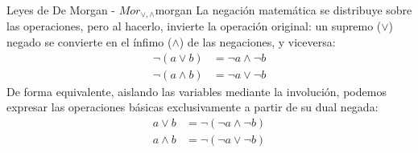 \begin{teorema}{Leyes de De Morgan - $Mor_{\vee, \wedge}$}{morgan}
La negación matemática se distribuye sobre las operaciones, pero al hacerlo, invierte la operación original: un supremo ($\vee$) negado se convierte en el ínfimo ($\wedge$) de las negaciones, y viceversa:
\begin{align}
    \neg (a \vee b) &= \neg a \wedge \neg b \\
    \neg (a \wedge b) &= \neg a \vee \neg b 
\end{align}
De forma equivalente, aislando las variables mediante la involución, podemos expresar las operaciones básicas exclusivamente a partir de su dual negada:
\begin{align}
    a \vee b &= \neg (\neg a \wedge \neg b) \\
    a \wedge b &= \neg (\neg a \vee \neg b) 
\end{align}
\end{teorema}
